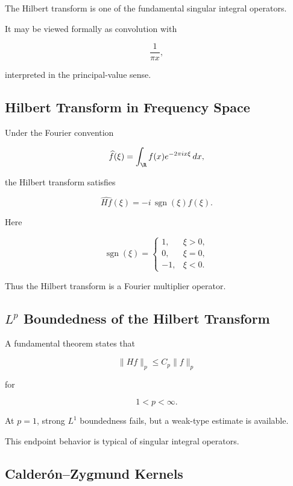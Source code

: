 The Hilbert transform is one of the fundamental singular integral
operators.

It may be viewed formally as convolution with

\[
\boxed{
\frac{1}{\pi x},
}
\]

interpreted in the principal-value sense.

\subsection{Hilbert Transform in Frequency Space}
\label{subsec:hilbert-transform-frequency}

Under the Fourier convention

\[
\widehat{f}(\xi)
=
\int_{\R}
f(x)e^{-2\pi ix\xi}\,dx,
\]

the Hilbert transform satisfies

\[
\boxed{
\widehat{Hf}(\xi)
=
-i\,\operatorname{sgn}(\xi)\widehat{f}(\xi).
}
\]

Here

\[
\operatorname{sgn}(\xi)
=
\begin{cases}
1, & \xi>0,\\
0, & \xi=0,\\
-1, & \xi<0.
\end{cases}
\]

Thus the Hilbert transform is a Fourier multiplier operator.

\subsection{\(L^p\) Boundedness of the Hilbert Transform}
\label{subsec:hilbert-lp-boundedness}

A fundamental theorem states that

\[
\boxed{
\|Hf\|_p
\leq
C_p\|f\|_p
}
\]

for

\[
\boxed{
1<p<\infty.
}
\]

At \(p=1\), strong \(L^1\) boundedness fails, but a weak-type estimate is
available.

This endpoint behavior is typical of singular integral operators.

\subsection{Calder\'on--Zygmund Kernels}
\label{subsec:calderon-zygmund-kernels}

